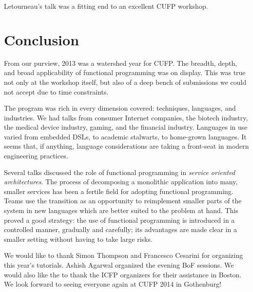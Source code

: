 \documentclass{jfp1}
\begin{document}
Letourneau's talk was a fitting end to an excellent CUFP workshop.

\section{Conclusion}

From our purview, 2013 was a watershed year for CUFP. The breadth,
depth, and broad applicability of functional programming was on
display. This was true not only at the workshop itself, but also of a
deep bench of submissions we could not accept due to time constraints.

The program was rich in every dimension covered: techniques,
languages, and industries. We had talks from consumer Internet
companies, the biotech industry, the medical device industry, gaming,
and the financial industry. Languages in use varied from embedded
DSLs, to academic stalwarts, to home-grown languages. It seems that,
if anything, language considerations are taking a front-seat in modern
engineering practices.

Several talks discussed the role of functional programming in
\textit{service oriented architectures}. The process of decomposing a
monolithic application into many, smaller services has been a
fertile field for adopting functional programming. Teams
use the transition as an opportunity to reimplement smaller parts of
the system in new languages which are better suited to the problem at
hand. This proved a good strategy: the use of functional programming
is introduced in a controlled manner, gradually and carefully; its
advantages are made clear in a smaller setting without having to take
large risks.

We would like to thank Simon Thompson and Francesco Cesarini for
organizing this year's tutorials. Ashish Agarwal organized the evening
BoF sessions. We would also like the to thank the ICFP organizers for
their assistance in Boston. We look forward to seeing everyone again
at CUFP 2014 in Gothenburg!


\end{document}

